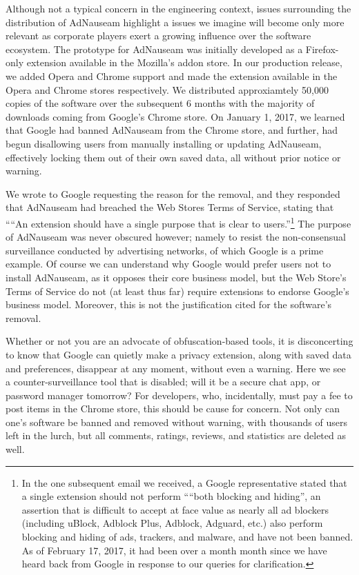 \documentclass[conference]{IEEEtran}
\begin{document}
Although not a typical concern in the engineering context, issues surrounding the distribution of AdNauseam highlight a issues we imagine will become only more relevant as corporate players exert a growing influence over the software ecosystem. The prototype for AdNauseam was initially developed as a Firefox-only extension available in the Mozilla's addon store. In our production release, we added Opera and Chrome support and made the extension available in the Opera and Chrome stores respectively. We distributed approxiamtely 50,000 copies of the software over the subsequent 6 months with the majority of downloads coming from Google's Chrome store. On January 1, 2017,  we learned that Google had banned AdNauseam from the Chrome store, and further, had begun disallowing users from manually installing or updating AdNauseam, effectively locking them out of their own saved data, all without prior notice or warning.

We wrote to Google requesting the reason for the removal, and they responded that AdNauseam had breached the Web Stores Terms of Service, stating that ““An extension should have a single purpose that is clear to users.”\footnote{In the one subsequent email we received, a Google representative stated that a single extension should not perform ““both blocking and hiding”, an assertion that is difficult to accept at face value as nearly all ad blockers (including uBlock, Adblock Plus, Adblock, Adguard, etc.) also perform blocking and hiding of ads, trackers, and malware, and have not been banned. As of February 17, 2017, it had been over a month month since we have heard back from Google in response to our queries for clarification.} The purpose of AdNauseam was never obscured however; namely to resist the non-consensual surveillance conducted by advertising networks, of which Google is a prime example. Of course we can  understand why Google would prefer users not to install AdNauseam, as it opposes their core business model, but the Web Store's Terms of Service do not (at least thus far) require extensions to endorse Google's business model. Moreover, this is not the justification cited for the software's removal.

Whether or not you are an advocate of obfuscation-based tools, it is disconcerting to know that Google can quietly make a privacy extension, along with saved data and preferences, disappear at any moment, without even a warning. Here we see a counter-surveillance tool that is disabled; will it be a secure chat app, or password manager tomorrow? For developers, who, incidentally, must pay a fee to post items in the Chrome store, this should be cause for concern. Not only can one's software be banned and removed without warning, with thousands of users left in the lurch, but all comments, ratings, reviews, and statistics are deleted as well.
\end{document}
